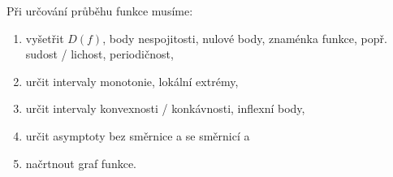 \begin{pozn}
    Při určování průběhu funkce musíme:
    \begin{enumerate}[$i.$]
    \item vyšetřit $D(f)$, body nespojitosti, nulové body, znaménka funkce, popř.
    sudost / lichost, periodičnost,
   	\item určit intervaly monotonie, lokální extrémy,
   	\item určit intervaly konvexnosti / konkávnosti, inflexní body,
   	\item určit asymptoty bez směrnice a se směrnicí a
   	\item načrtnout graf funkce.
    \end{enumerate}
\end{pozn}
